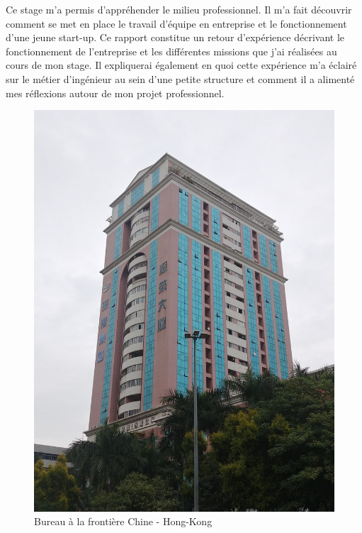 \documentclass[a4paper, 12pt, sffamily]{report}
\begin{document}
Ce stage m’a permis d’appréhender le milieu professionnel. Il m’a fait découvrir comment se met en place le travail d'équipe en entreprise et le fonctionnement d'une jeune start-up. Ce rapport constitue un retour d’expérience décrivant le fonctionnement de l’entreprise et les différentes missions que j’ai réalisées au cours de mon stage. Il expliquerai également en quoi cette expérience m’a éclairé sur le métier d’ingénieur au sein d’une petite structure et comment il a alimenté mes réflexions autour de mon projet professionnel.

\begin{figure}
\centering
\includegraphics[scale=0.15]{figures/photos/photo_building.jpg}
\caption{Bureau à la frontière Chine - Hong-Kong}
\label{fig:photo_building}
\end{figure}

\end{document}
